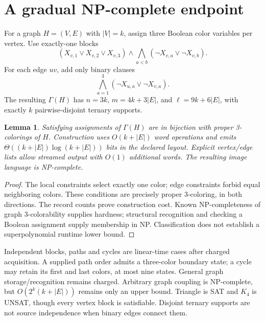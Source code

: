 \documentclass[11pt]{article}
\newtheorem{lemma}{Lemma}
\begin{document}
\section{A gradual NP-complete endpoint}
For a graph $H=(V,E)$ with $|V|=k$, assign three Boolean color variables per vertex. Use exactly-one blocks
\[
(X_{v,1}\vee X_{v,2}\vee X_{v,3})\wedge\bigwedge_{a<b}(\neg X_{v,a}\vee\neg X_{v,b}).
\]
For each edge $uv$, add only binary clauses
\[
\bigwedge_{a=1}^{3}(\neg X_{u,a}\vee\neg X_{v,a}).
\]
The resulting $\Gamma(H)$ has $n=3k$, $m=4k+3|E|$, and $\ell=9k+6|E|$, with exactly $k$ pairwise-disjoint ternary supports.

\begin{lemma}
Satisfying assignments of $\Gamma(H)$ are in bijection with proper 3-colorings of $H$. Construction uses $O(k+|E|)$ word operations and emits $\Theta((k+|E|)\log(k+|E|))$ bits in the declared layout. Explicit vertex/edge lists allow streamed output with $O(1)$ additional words. The resulting image language is NP-complete.
\end{lemma}
\begin{proof}
The local constraints select exactly one color; edge constraints forbid equal neighboring colors. These conditions are precisely proper 3-coloring, in both directions. The record counts prove construction cost. Known NP-completeness of graph 3-colorability supplies hardness; structural recognition and checking a Boolean assignment supply membership in NP. Classification does not establish a superpolynomial runtime lower bound.
\end{proof}
Independent blocks, paths and cycles are linear-time cases after charged acquisition. A supplied path order admits a three-color boundary state; a cycle may retain its first and last colors, at most nine states. General graph storage/recognition remains charged. Arbitrary graph coupling is NP-complete, but $O(2^k(k+|E|))$ remains only an upper bound. Triangle is SAT and $K_4$ is UNSAT, though every vertex block is satisfiable. Disjoint ternary supports are not source independence when binary edges connect them.
\end{document}
